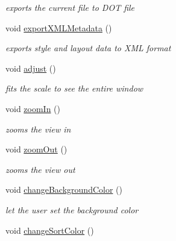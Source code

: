 \begin{DoxyCompactItemize}
\begin{DoxyCompactList}\small\item\em exports the current file to \-D\-O\-T file \end{DoxyCompactList}\item 
\hypertarget{class_main_window_a6508549190bb7d638e48317c65ed7380}{void \hyperlink{class_main_window_a6508549190bb7d638e48317c65ed7380}{export\-X\-M\-L\-Metadata} ()}\label{class_main_window_a6508549190bb7d638e48317c65ed7380}

\begin{DoxyCompactList}\small\item\em exports style and layout data to \-X\-M\-L format \end{DoxyCompactList}\item 
\hypertarget{class_main_window_a38a21fe3722b03dff23981f5e7a7fb50}{void \hyperlink{class_main_window_a38a21fe3722b03dff23981f5e7a7fb50}{adjust} ()}\label{class_main_window_a38a21fe3722b03dff23981f5e7a7fb50}

\begin{DoxyCompactList}\small\item\em fits the scale to see the entire window \end{DoxyCompactList}\item 
\hypertarget{class_main_window_aa13e39ece777521d3f176155899309a6}{void \hyperlink{class_main_window_aa13e39ece777521d3f176155899309a6}{zoom\-In} ()}\label{class_main_window_aa13e39ece777521d3f176155899309a6}

\begin{DoxyCompactList}\small\item\em zooms the view in \end{DoxyCompactList}\item 
\hypertarget{class_main_window_a21d4700dd4bc51216443a4c788b85892}{void \hyperlink{class_main_window_a21d4700dd4bc51216443a4c788b85892}{zoom\-Out} ()}\label{class_main_window_a21d4700dd4bc51216443a4c788b85892}

\begin{DoxyCompactList}\small\item\em zooms the view out \end{DoxyCompactList}\item 
\hypertarget{class_main_window_a1a7e2b9194e7134bca5fcf1dd4842a07}{void \hyperlink{class_main_window_a1a7e2b9194e7134bca5fcf1dd4842a07}{change\-Background\-Color} ()}\label{class_main_window_a1a7e2b9194e7134bca5fcf1dd4842a07}

\begin{DoxyCompactList}\small\item\em let the user set the background color \end{DoxyCompactList}\item 
\hypertarget{class_main_window_a608f0b442dc8d0e1c68807b1955d5182}{void \hyperlink{class_main_window_a608f0b442dc8d0e1c68807b1955d5182}{change\-Sort\-Color} ()}\label{class_main_window_a608f0b442dc8d0e1c68807b1955d5182}


\end{DoxyCompactItemize}
